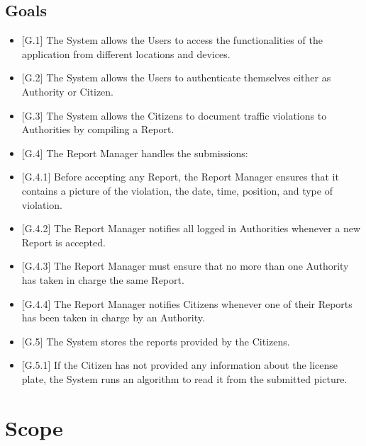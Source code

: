 \documentclass{report}
\begin{document}
\subsection{Goals}
\begin{itemize}
    \item {[G.1]} The System allows the Users to access the functionalities of the application from different locations and devices.
    \item {[G.2]} The System allows the Users to authenticate themselves either as Authority or Citizen.
    \item {[G.3]} The System allows the Citizens to document traffic violations to Authorities by compiling a Report.
    \item {[G.4]} The Report Manager handles the submissions:
    \indent \item {[G.4.1]} Before accepting any Report, the Report Manager ensures that it contains a picture of the violation, the date, time, position, and type of violation.
    \indent \item {[G.4.2]} The Report Manager notifies all logged in Authorities whenever a new Report is accepted.
    \indent \item {[G.4.3]} The Report Manager must ensure that no more than one Authority has taken in charge the same Report.
    \indent \item {[G.4.4]} The Report Manager notifies Citizens whenever one of their Reports has been taken in charge by an Authority.
    \item {[G.5]} The System stores the reports provided by the Citizens.
    \indent \item  {[G.5.1]} If the Citizen has not provided any information about the license plate, the System runs an algorithm to read it from the submitted picture.
\end{itemize}
\section{Scope}
\end{document}
